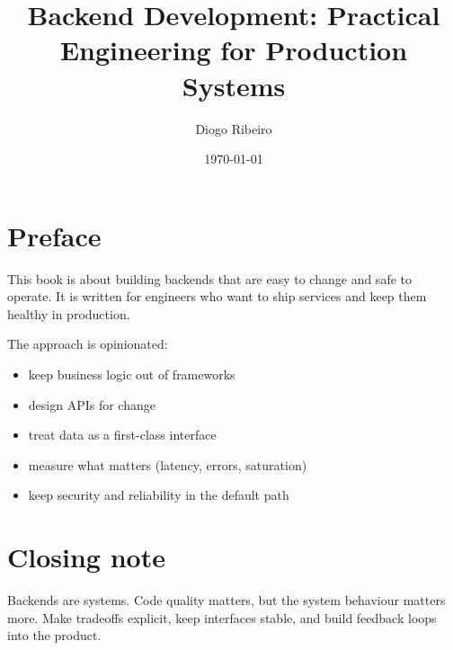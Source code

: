 \documentclass[11pt,a4paper,oneside]{book}
\title{Backend Development: Practical Engineering for Production Systems}
\author{Diogo Ribeiro}
\date{\today}
\begin{document}
\frontmatter
\maketitle
\tableofcontents

\chapter*{Preface}
This book is about building backends that are easy to change and safe to operate.
It is written for engineers who want to ship services and keep them healthy in production.

The approach is opinionated:
\begin{itemize}
  \item keep business logic out of frameworks
  \item design APIs for change
  \item treat data as a first-class interface
  \item measure what matters (latency, errors, saturation)
  \item keep security and reliability in the default path
\end{itemize}

\mainmatter






















\appendix



\backmatter
\chapter*{Closing note}
Backends are systems.
Code quality matters, but the system behaviour matters more.
Make tradeoffs explicit, keep interfaces stable, and build feedback loops into the product.
\end{document}

